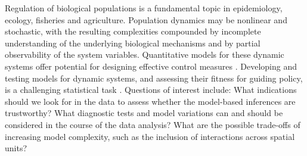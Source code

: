 \documentclass[10pt,letterpaper]{article}\usepackage[]{graphicx}\usepackage[table]{xcolor}
\begin{document}
Regulation of biological populations is a fundamental topic in epidemiology, ecology, fisheries and agriculture.
Population dynamics may be nonlinear and stochastic, with the resulting complexities compounded by incomplete understanding of the underlying biological mechanisms and by partial observability of the system variables.
Quantitative models for these dynamic systems offer potential for designing effective control measures .
Developing and testing models for dynamic systems, and assessing their fitness for guiding policy, is a challenging statistical task .
Questions of interest include: What indications should we look for in the data to assess whether the model-based inferences are trustworthy?
What diagnostic tests and model variations can and should be considered in the course of the data analysis?
What are the possible trade-offs of increasing model complexity, such as the inclusion of interactions across spatial units?
\end{document}
